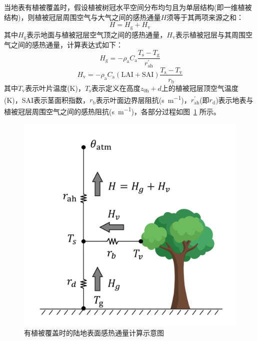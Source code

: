 当地表有植被覆盖时，假设植被树冠水平空间分布均匀且为单层结构(即一维植被结构)，则植被冠层周围空气与大气之间的感热通量$H$须等于其两项来源之和：
\begin{equation}\label{HV_balance}
  H=H_{\mathrm{g}}+H_{\mathrm{v}}
\end{equation}
其中$H_{\mathrm{g}}$表示地面与植被冠层空气顶之间的感热通量，$H_{\mathrm{v}}$表示植被冠层与其周围空气之间的感热通量，计算表达式如下：
\begin{equation}
  H_{\mathrm{g}}=-\rho_{\mathrm{a}} C_{\mathrm{a}} \frac{T_{\mathrm{s}}-T_{\mathrm{g}}}{r_{\mathrm{a h}}^{\prime}}
\end{equation}
\begin{equation}
  H_{\mathrm{v}}=-\rho_{\mathrm{a}} C_{\mathrm{a}}(\text {LAI}+\text {SAI}) \frac{T_{\mathrm{s}}-T_{\mathrm{v}}}{r_{\mathrm{b}}}
\end{equation}
其中$T_{\mathrm {v}}$表示叶片温度(K)，$T_{\mathrm {s}}$表示定义在高度$z_{\mathrm{0h}}+d$上的植被冠层顶空气温度(K)，SAI表示茎面积指数，$r_{\mathrm {b}}$表示叶面边界层阻抗(\unit{s.m^{-1}})，$r_{\mathrm{ah}}^\prime$(即$r_{\mathrm {d}}$)表示地表与植被冠层周围空气之间的感热阻抗(\unit{s.m^{-1}})，各部分过程如图~\ref{fig:有植被覆盖部分的陆地表面感热通量示意图} 所示。
{
  \begin{figure}[htbp]
    \centering
    \includegraphics[width=0.6\linewidth]{Figures/地表湍流交换过程/有植被感热交换阻抗示意图.png}
    \caption{有植被覆盖时的陆地表面感热通量计算示意图}
    \label{fig:有植被覆盖部分的陆地表面感热通量示意图}
  \end{figure}
}

